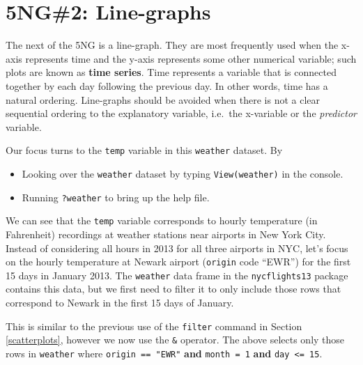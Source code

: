 \documentclass[]{tufte-book}
\newenvironment{Shaded}{\begin{snugshade}}{\end{snugshade}}
\newcommand{\KeywordTok}[1]{\textcolor[rgb]{0.13,0.29,0.53}{\textbf{{#1}}}}
\newcommand{\DecValTok}[1]{\textcolor[rgb]{0.00,0.00,0.81}{{#1}}}
\newcommand{\StringTok}[1]{\textcolor[rgb]{0.31,0.60,0.02}{{#1}}}
\newcommand{\NormalTok}[1]{{#1}}
\providecommand{\tightlist}{%
  \setlength{\itemsep}{0pt}\setlength{\parskip}{0pt}}
\theoremstyle{definition}
\theoremstyle{definition}
\theoremstyle{remark}
\begin{document}
\section{5NG\#2: Line-graphs}\label{linegraphs}

The next of the 5NG is a line-graph. They are most frequently used when
the x-axis represents time and the y-axis represents some other
numerical variable; such plots are known as \textbf{time series}. Time
represents a variable that is connected together by each day following
the previous day. In other words, time has a natural ordering.
Line-graphs should be avoided when there is not a clear sequential
ordering to the explanatory variable, i.e.~the x-variable or the
\emph{predictor} variable.

Our focus turns to the \texttt{temp} variable in this \texttt{weather}
dataset. By

\begin{itemize}
\tightlist
\item
  Looking over the \texttt{weather} dataset by typing
  \texttt{View(weather)} in the console.
\item
  Running \texttt{?weather} to bring up the help file.
\end{itemize}

We can see that the \texttt{temp} variable corresponds to hourly
temperature (in Fahrenheit) recordings at weather stations near airports
in New York City. Instead of considering all hours in 2013 for all three
airports in NYC, let's focus on the hourly temperature at Newark airport
(\texttt{origin} code ``EWR'') for the first 15 days in January 2013.
The \texttt{weather} data frame in the \texttt{nycflights13} package
contains this data, but we first need to filter it to only include those
rows that correspond to Newark in the first 15 days of January.

\begin{Shaded}
\end{Shaded}

This is similar to the previous use of the \texttt{filter} command in
Section \ref{scatterplots}, however we now use the \texttt{\&} operator.
The above selects only those rows in \texttt{weather} where
\texttt{origin\ ==\ "EWR"} \textbf{and} \texttt{month\ =\ 1}
\textbf{and} \texttt{day\ \textless{}=\ 15}.
\end{document}

